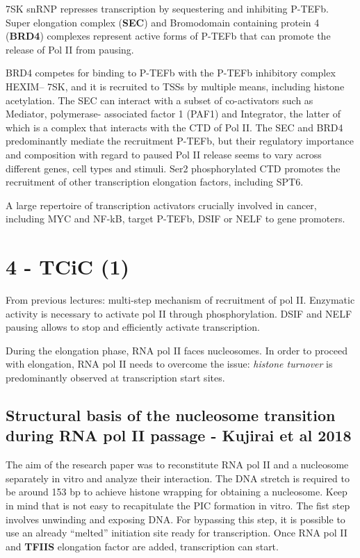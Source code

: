 7SK snRNP represses transcription by sequestering and inhibiting P-TEFb. Super elongation complex (\textbf{SEC}) and Bromodomain containing protein 4 (\textbf{BRD4}) complexes represent active forms of P-TEFb that can promote the release of Pol II from pausing.

BRD4 competes for binding to P-TEFb with the P-TEFb inhibitory complex HEXIM-- 7SK, and it is recruited to TSSs by multiple means, including histone acetylation. The SEC can interact with a subset of co-activators such as Mediator, polymerase- associated factor 1 (PAF1) and Integrator, the latter of which is a complex that interacts with the CTD of Pol II. The SEC and BRD4 predominantly mediate the recruitment P-TEFb, but their regulatory importance and composition with regard to paused Pol II release seems to vary across different genes, cell types and stimuli. Ser2 phosphorylated CTD promotes the recruitment of other transcription elongation factors, including SPT6.

A large repertoire of transcription activators crucially involved in cancer, including MYC and NF-kB, target P-TEFb, DSIF or NELF to gene promoters.

\hypertarget{tcic-1}{%
\section{4 - TCiC (1)}\label{tcic-1}}

From previous lectures: multi-step mechanism of recruitment of pol II. Enzymatic activity is necessary to activate pol II through phosphorylation. DSIF and NELF pausing allows to stop and efficiently activate transcription.

During the elongation phase, RNA pol II faces nucleosomes. In order to proceed with elongation, RNA pol II needs to overcome the issue: \emph{histone turnover} is predominantly observed at transcription start sites.

\hypertarget{structural-basis-of-the-nucleosome-transition-during-rna-pol-ii-passage---kujirai-et-al-2018}{%
\subsection{Structural basis of the nucleosome transition during RNA pol II passage - Kujirai et al 2018}\label{structural-basis-of-the-nucleosome-transition-during-rna-pol-ii-passage---kujirai-et-al-2018}}

The aim of the research paper was to reconstitute RNA pol II and a nucleosome separately in vitro and analyze their interaction. The DNA stretch is required to be around 153 bp to achieve histone wrapping for obtaining a nucleosome. Keep in mind that is not easy to recapitulate the PIC formation in vitro. The fist step involves unwinding and exposing DNA. For bypassing this step, it is possible to use an already ``melted'' initiation site ready for transcription. Once RNA pol II and \textbf{TFIIS} elongation factor are added, transcription can start.

